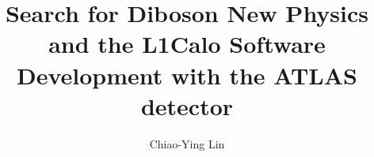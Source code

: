 \documentclass[hyperpdf,bindnopdf]{hepthesis}
\title{Search for Diboson New Physics and the L1Calo Software Development with the ATLAS detector}
\author{Chiao-Ying Lin}
\begin{document}
%    
	
\begin{mainmatter}
	\begin{spacing}{1.4}
    
    \let\cleardoublepage\clearpage
    
	\let\cleardoublepage\clearpage
 	
 	\let\cleardoublepage\clearpage
 	
 	\let\cleardoublepage\clearpage
 	
 	\let\cleardoublepage\clearpage
 	
    \let\cleardoublepage\clearpage
 	
 	\let\cleardoublepage\clearpage
 	\end{spacing}
\end{mainmatter}
	
%		
	
	\begin{backmatter}
		
	\end{backmatter}
	
\end{document}
